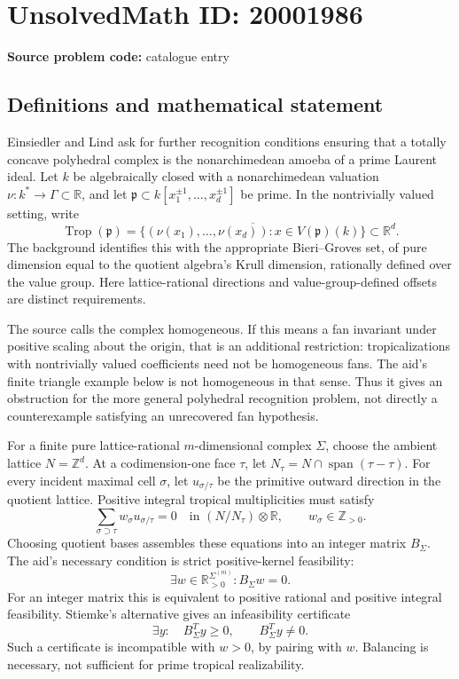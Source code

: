 \documentclass[11pt]{article}
\newcommand{\Z}{\mathbb{Z}}
\newcommand{\R}{\mathbb{R}}
\begin{document}
\section*{UnsolvedMath ID: 20001986}
\textbf{Source problem code:} catalogue entry
\subsection{Definitions and mathematical statement}
Einsiedler and Lind ask for further recognition conditions ensuring that a totally concave polyhedral complex is the nonarchimedean amoeba of a prime Laurent ideal. Let \(k\) be algebraically closed with a nonarchimedean valuation \(\nu:k^*\to\Gamma\subset\R\), and let \(\mathfrak p\subset k[x_1^{\pm1},\ldots,x_d^{\pm1}]\) be prime. In the nontrivially valued setting, write
\[
 \operatorname{Trop}(\mathfrak p)=
 \overline{\{(\nu(x_1),\ldots,\nu(x_d)):
                  x\in V(\mathfrak p)(k)\}}\subset\R^d.
\]
The background identifies this with the appropriate Bieri--Groves set, of pure dimension equal to the quotient algebra's Krull dimension, rationally defined over the value group. Here lattice-rational directions and value-group-defined offsets are distinct requirements.

The source calls the complex homogeneous. If this means a fan invariant under positive scaling about the origin, that is an additional restriction: tropicalizations with nontrivially valued coefficients need not be homogeneous fans. The aid's finite triangle example below is not homogeneous in that sense. Thus it gives an obstruction for the more general polyhedral recognition problem, not directly a counterexample satisfying an unrecovered fan hypothesis.

For a finite pure lattice-rational \(m\)-dimensional complex \(\Sigma\), choose the ambient lattice \(N=\Z^d\). At a codimension-one face \(\tau\), let \(N_\tau=N\cap\operatorname{span}(\tau-\tau)\). For every incident maximal cell \(\sigma\), let \(u_{\sigma/\tau}\) be the primitive outward direction in the quotient lattice. Positive integral tropical multiplicities must satisfy
\[
 \sum_{\sigma\supset\tau}w_\sigma u_{\sigma/\tau}=0
 \quad\text{in }(N/N_\tau)\otimes\R,
 \qquad w_\sigma\in\Z_{>0}.
\]
Choosing quotient bases assembles these equations into an integer matrix \(B_\Sigma\). The aid's necessary condition is strict positive-kernel feasibility:
\[
 \exists w\in\R_{>0}^{\Sigma^{(m)}}:B_\Sigma w=0.
\]
For an integer matrix this is equivalent to positive rational and positive integral feasibility. Stiemke's alternative gives an infeasibility certificate
\[
 \exists y:\quad B_\Sigma^Ty\geq0,
 \qquad B_\Sigma^Ty\ne0.
\]
Such a certificate is incompatible with \(w>0\), by pairing with \(w\). Balancing is necessary, not sufficient for prime tropical realizability.
\end{document}
